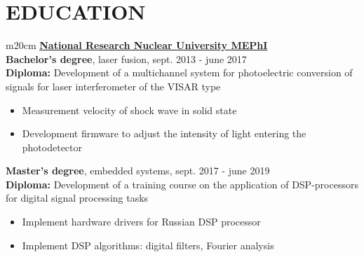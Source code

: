 \documentclass{anisyan-resume}
\begin{document}
	\vspace{5pt}
	\section{\textbf{EDUCATION}}
	\vspace{5pt}
	\def\arraystretch{1.2}
	\begin{tabular}{ m{20cm} }
		\quad\href{https://eng.mephi.ru/}{\large \textbf{National Research Nuclear University MEPhI}} \\
		\quad\normalsize{\textbf{Bachelor's degree}, laser fusion, sept. 2013 - june 2017} \\
		\quad\small\textbf{Diploma: } \small{Development of a multichannel system for photoelectric conversion of signals for laser interferometer of the VISAR type} \\
		\renewcommand\labelitemi{{\boldmath$\cdot$}}
			\begin{itemize}[noitemsep, topsep=5pt, parsep=0pt, partopsep=0pt]
				\addtolength{\itemindent}{40pt}
				\item {\small Measurement velocity of shock wave in solid state}
				\item {\small Development firmware to adjust the intensity of light entering the photodetector}
			\end{itemize}

		\vspace{5pt}

		\quad\normalsize{\textbf{Master's degree}, embedded systems, sept. 2017 - june 2019} \\
		\quad\small\textbf{Diploma: } \small{Development of a training course on the application of DSP-processors for digital signal processing tasks} \\
		\renewcommand\labelitemi{{\boldmath$\cdot$}}
		\begin{itemize}[noitemsep, topsep=5pt, parsep=0pt, partopsep=0pt]
			\addtolength{\itemindent}{40pt}
			\item {\small Implement hardware drivers for Russian DSP processor}
			\item {\small Implement DSP algorithms: digital filters, Fourier analysis}
		\end{itemize}
	\end{tabular}

	\vspace{5pt}
\end{document}
